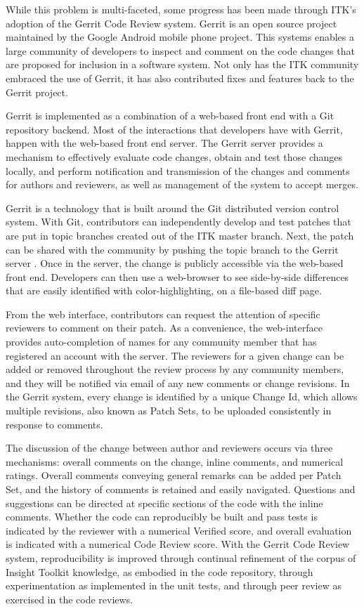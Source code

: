 \documentclass{frontiersENG} %
\begin{document}
While this problem is multi-faceted, some progress has been made through ITK’s
adoption of the Gerrit Code Review system.  Gerrit is an open source project
maintained by the Google Android mobile phone project. This systems enables a
large community of developers to inspect and comment on the code changes that
are proposed for inclusion in a software system. Not only has the ITK community
embraced the use of Gerrit, it has also contributed fixes and features back to
the Gerrit project.

Gerrit is implemented as a combination of a web-based front end with a Git
repository backend. Most of the interactions that developers have with Gerrit,
happen with the web-based front end server. The Gerrit server provides a
mechanism to effectively evaluate code changes, obtain and test those changes
locally, and perform notification and transmission of the changes and comments
for authors and reviewers, as well as management of the system to accept
merges.

Gerrit is a technology that is built around the Git distributed version control
system.  With Git, contributors can independently develop and test patches that
are put in topic branches created out of the ITK master branch.  Next, the
patch can be shared with the community by pushing the topic branch to the
Gerrit server \cite{ITKGerrit}.  Once in the server, the change is publicly
accessible via the web-based front end.  Developers can then use a web-browser
to see side-by-side differences that are easily identified with
color-highlighting, on a file-based diff page.

From the web interface, contributors can request the attention of specific
reviewers to comment on their patch. As a convenience, the web-interface
provides auto-completion of names for any community member that has registered
an account with the server.  The reviewers for a given change can be added or
removed throughout the review process by any community members, and they will
be notified via email of any new comments or change revisions.  In the Gerrit
system, every change is identified by a unique Change Id, which allows multiple
revisions, also known as Patch Sets, to be uploaded consistently in response to
comments.

The discussion of the change between author and reviewers occurs via three
mechanisms: overall comments on the change, inline comments, and numerical
ratings. Overall comments conveying general remarks can be added per Patch
Set, and the history of comments is retained and easily navigated. Questions
and suggestions can be directed at specific sections of the code with the
inline comments. Whether the code can reproducibly be built and pass tests is
indicated by the reviewer with a numerical Verified score, and overall
evaluation is indicated with a numerical Code Review score. With the Gerrit
Code Review system, reproducibility is improved through continual refinement of
the corpus of Insight Toolkit knowledge, as embodied in the code repository,
through experimentation as implemented in the unit tests, and through peer
review as exercised in the code reviews.
\end{document}
